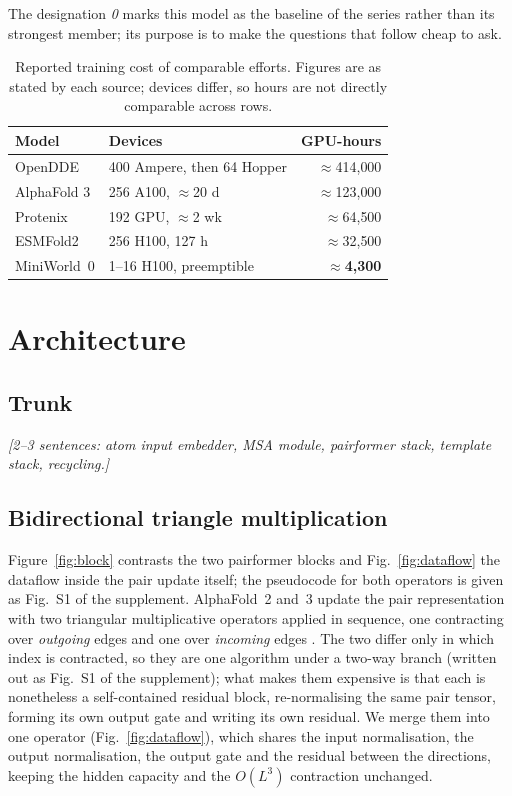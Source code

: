 \documentclass[11pt]{article}
\newcommand{\todo}[1]{{\color{draft}\itshape\small[#1]}}
\newcommand{\mw}{MiniWorld~0}
\begin{document}
The designation \emph{0} marks this model as the baseline of the series rather
than its strongest member; its purpose is to make the questions that follow
cheap to ask.

\begin{table}[t]
\centering\small\sffamily
\caption{\normalfont\rmfamily Reported training cost of comparable efforts.
Figures are as stated by each source; devices differ, so hours are not directly
comparable across rows.}
\label{tab:compute}
\begin{tabularx}{\linewidth}{@{}Xlr@{}}
\toprule
\rmfamily Model & \rmfamily Devices & \rmfamily GPU-hours \\
\midrule
OpenDDE \citep{opendde}        & 400 Ampere, then 64 Hopper & $\approx$414{,}000 \\
AlphaFold 3 \citep{af3}        & 256 A100, $\approx$20 d    & $\approx$123{,}000 \\
Protenix \citep{protenix}      & 192 GPU, $\approx$2 wk     & $\approx$64{,}500 \\
ESMFold2 \citep{esmfold2}      & 256 H100, 127 h            & $\approx$32{,}500 \\
\midrule
\mw{}                          & 1--16 H100, preemptible    & \textbf{$\approx$4{,}300} \\
\bottomrule
\end{tabularx}
\end{table}

\section{Architecture}
\label{sec:arch}
\subsection{Trunk}
\todo{2--3 sentences: atom input embedder, MSA module, pairformer stack,
template stack, recycling.}

\subsection{Bidirectional triangle multiplication}
\label{sec:bidir}
Figure~\ref{fig:block} contrasts the two pairformer blocks and
Fig.~\ref{fig:dataflow} the dataflow inside the pair update itself; the
pseudocode for both operators is given as Fig.~S1 of the supplement.
AlphaFold~2 and~3 update the pair representation with two triangular
multiplicative operators applied in sequence, one contracting over
\emph{outgoing} edges and one over \emph{incoming} edges
\citep[Alg.~12--13]{af3}. The two differ only in which index is contracted, so
they are one algorithm under a two-way branch (written out as
Fig.~S1 of the supplement); what makes them expensive is that each is
nonetheless a self-contained residual block, re-normalising the same pair
tensor, forming its own output gate and writing its own residual. We merge them
into one operator (Fig.~\ref{fig:dataflow}), which
shares the input normalisation, the output normalisation, the output gate and
the residual between the directions, keeping the hidden capacity and the
$O(L^{3})$ contraction unchanged.
\end{document}
